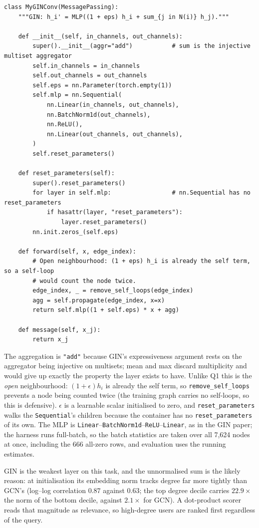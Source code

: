 \begin{lstlisting}[style=p1pystyle]
class MyGINConv(MessagePassing):
    """GIN: h_i' = MLP((1 + eps) h_i + sum_{j in N(i)} h_j)."""

    def __init__(self, in_channels, out_channels):
        super().__init__(aggr="add")           # sum is the injective multiset aggregator
        self.in_channels = in_channels
        self.out_channels = out_channels
        self.eps = nn.Parameter(torch.empty(1))
        self.mlp = nn.Sequential(
            nn.Linear(in_channels, out_channels),
            nn.BatchNorm1d(out_channels),
            nn.ReLU(),
            nn.Linear(out_channels, out_channels),
        )
        self.reset_parameters()

    def reset_parameters(self):
        super().reset_parameters()
        for layer in self.mlp:                 # nn.Sequential has no reset_parameters
            if hasattr(layer, "reset_parameters"):
                layer.reset_parameters()
        nn.init.zeros_(self.eps)

    def forward(self, x, edge_index):
        # Open neighbourhood: (1 + eps) h_i is already the self term, so a self-loop
        # would count the node twice.
        edge_index, _ = remove_self_loops(edge_index)
        agg = self.propagate(edge_index, x=x)
        return self.mlp((1 + self.eps) * x + agg)

    def message(self, x_j):
        return x_j
\end{lstlisting}

\noindent
The aggregation is \texttt{"add"} because GIN's expressiveness argument rests on the
aggregator being injective on multisets; mean and max discard multiplicity and would
give up exactly the property the layer exists to have. Unlike Q1 this is the
\emph{open} neighbourhood: $(1+\epsilon)h_i$ is already the self term, so
\texttt{remove\_self\_loops} prevents a node being counted twice (the training graph
carries no self-loops, so this is defensive). $\epsilon$ is a learnable scalar
initialised to zero, and \texttt{reset\_parameters} walks the \texttt{Sequential}'s
children because the container has no \texttt{reset\_parameters} of its own. The MLP
is \texttt{Linear}--\texttt{BatchNorm1d}--\texttt{ReLU}--\texttt{Linear}, as in the GIN
paper; the harness runs full-batch, so the batch statistics are taken over all 7{,}624
nodes at once, including the 666 all-zero rows, and evaluation uses the running
estimates.

GIN is the weakest layer on this task, and the unnormalised sum is the likely reason:
at initialisation its embedding norm tracks degree far more tightly than GCN's
(log--log correlation $0.87$ against $0.63$; the top degree decile carries
$22.9\times$ the norm of the bottom decile, against $2.1\times$ for GCN). A
dot-product scorer reads that magnitude as relevance, so high-degree users are ranked
first regardless of the query.

